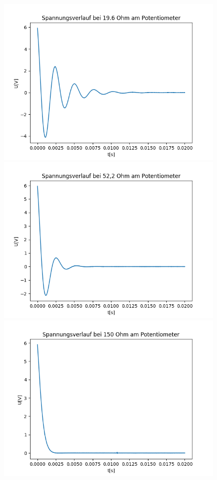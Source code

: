 \documentclass[12pt,a4paper]{article}
\begin{document}
\begin{figure}
\begin{center}
\includegraphics[scale=0.5]{Bilder/Spannungsverlauf19,6Ohm}
\includegraphics[scale=0.5]{Bilder/Spannungsverlauf52,2Ohm}
\includegraphics[scale=0.5]{Bilder/Spannungsverlauf150Ohm}

\end{center}
\end{figure}
\end{document}
